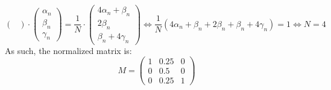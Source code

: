 \documentclass[11pt, legalpaper]{article}
\begin{document}
\begin{enumerate}
$$\begin{pmatrix}
    \end{pmatrix} \cdot \begin{pmatrix} \alpha_n \\ \beta_n \\ \gamma_n \end{pmatrix}= \frac{1}{N} \cdot \begin{pmatrix} 4\alpha_n+\beta_n \\ 2\beta_n \\ \beta_n + 4\gamma_n \end{pmatrix} \Longleftrightarrow \frac{1}{N}(4\alpha_n+\beta_n +  2\beta_n + \beta_n + 4\gamma_n)=1 \Longleftrightarrow N=4 $$
    As such, the normalized matrix is:
    $$\boxed{M=\begin{pmatrix}
            1 & 0.25 & 0 \\
            0 & 0.5 & 0 \\
            0 & 0.25 & 1
        \end{pmatrix}}$$
    

\end{enumerate}
\end{document}
